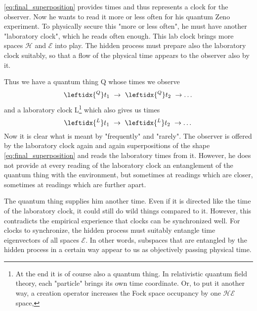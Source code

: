 \documentclass[12pt]{article}
\begin{document}
\eqref{eq:final_superposition} provides times and thus represents a clock for the observer. Now he wants to read it more or less often for his quantum Zeno experiment. To physically secure this "more or less often", he must have another "laboratory clock", which he reads often enough. This lab clock brings more spaces $\mathscr{H}$ and $\mathscr{E}$ into play. The hidden process must prepare also the laboratory clock suitably, so that a flow of the physical time appears to the observer also by it.

Thus we have a quantum thing Q whose times we observe
\begin{equation*}
\leftidx{^Q}t_1\ \rightarrow\ \leftidx{^Q}t_2\ \rightarrow \dots
\end{equation*}
and a laboratory clock L\footnote{At the end it is of course also a quantum thing. In relativistic quantum field theory, each "particle" brings its own time coordinate. Or, to put it another way, a creation operator increases the Fock space occupancy by one $\mathscr{H} \mathscr{E}$ space,} which also gives us times
\begin{equation*}
\leftidx{^L}t_1\ \rightarrow\ \leftidx{^L}t_2 \ \rightarrow \dots
\end{equation*}
Now it is clear what is meant by "frequently" and "rarely". The observer is offered by the laboratory clock again and again superpositions of the shape \eqref{eq:final_superposition} and reads the laboratory times from it. However, he does not provide at every reading of the laboratory clock an entanglement of the quantum thing with the environment, but sometimes at readings which are closer, sometimes at readings which are further apart. 

The quantum thing supplies him another time. Even if it is directed like the time of the laboratory clock, it could still do wild things compared to it. However, this contradicts the empirical experience that clocks can be synchronized well. For clocks to synchronize, the hidden process must suitably entangle time eigenvectors of all spaces $\mathscr{E}$. In other words, subspaces that are entangled by the hidden process in a certain way appear to us as objectively passing physical time.
\end{document}
